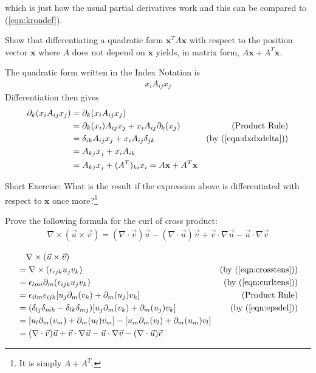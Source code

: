 which is just how the usual partial derivatives work and this can be compared to (\ref{eqn:krondef}).
\begin{exmp}
Show that differentiating a quadratic form $\textbf{x}^TA\textbf{x}$ with respect to the position vector $\textbf{x}$ where $A$ does not depend on $\textbf{x}$ yields, in matrix form, $A\textbf{x} + A^T\textbf{x}$.
\end{exmp}
\begin{solution}
The quadratic form written in the Index Notation is
\begin{align*}
x_iA_{ij}x_j
\end{align*}
Differentiation then gives
\begin{align*}
\partial_k (x_iA_{ij}x_j) &= \partial_k (x_iA_{ij}x_j) \\
&= \partial_k (x_i) A_{ij}x_j + x_iA_{ij} \partial_k (x_j) & \text{(Product Rule)} \\
&= \delta_{ik} A_{ij}x_j + x_iA_{ij} \delta_{jk} & \text{(by (\ref{eqn:dxdxdelta}))} \\
&= A_{kj}x_j + x_iA_{ik} \\
&= A_{kj}x_j + (A^T)_{ki}x_i = A\textbf{x} + A^T\textbf{x}
\end{align*}
\end{solution}
Short Exercise: What is the result if the expression above is differentiated with respect to $\textbf{x}$ once more?\footnote{It is simply $A+A^T$.}

\begin{exmp}
Prove the following formula for the curl of cross product:
\begin{align}
\nabla \times (\vec{u} \times \vec{v}) = (\nabla \cdot \vec{v})\vec{u} - (\nabla \cdot \vec{u})\vec{v}  + \vec{v} \cdot \nabla\vec{u} - \vec{u} \cdot \nabla\vec{v} 
\end{align}
\end{exmp}
\begin{solution}
\begin{align*}
&\quad \nabla \times (\vec{u} \times \vec{v}) \\
&= \nabla \times (\epsilon_{ijk}u_jv_k) &\text{(by (\ref{eqn:crosstens}))} \\
&= \epsilon_{lmi}\partial_m (\epsilon_{ijk}u_jv_k) &\text{(by (\ref{eqn:curltens}))} \\
&= \epsilon_{ilm}\epsilon_{ijk} [u_j\partial_m(v_k) + \partial_m(u_j)v_k] &\text{(Product Rule)} \\
&= (\delta_{lj}\delta_{mk} - \delta_{lk}\delta_{mj}) [u_j\partial_m(v_k) + \partial_m(u_j)v_k] &\text{(by (\ref{eqn:epsdel}))} \\
&= [u_l\partial_m(v_m) + \partial_m(u_l)v_m] - [u_m\partial_m(v_l) + \partial_m(u_m)v_l] \\
&= (\nabla \cdot \vec{v})\vec{u} + \vec{v} \cdot \nabla\vec{u} - \vec{u} \cdot \nabla\vec{v} - (\nabla \cdot \vec{u})\vec{v}
\end{align*}
\end{solution}

